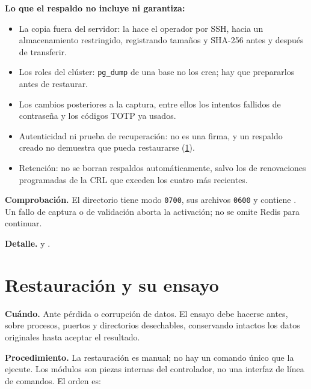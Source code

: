 \textbf{Lo que el respaldo no incluye ni garantiza:}

\begin{itemize}
  \item La copia fuera del servidor: la hace el operador por SSH, hacia un
        almacenamiento restringido, registrando tamaños y SHA-256 antes y
        después de transferir.
  \item Los roles del clúster: \texttt{pg\_dump} de una base no los crea;
        hay que prepararlos antes de restaurar.
  \item Los cambios posteriores a la captura, entre ellos los intentos
        fallidos de contraseña y los códigos TOTP ya usados.
  \item Autenticidad ni prueba de recuperación:  no es una
        firma, y un respaldo creado no demuestra que pueda restaurarse
        (\cref{sec:op-restauracion}).
  \item Retención: no se borran respaldos automáticamente, salvo los de
        renovaciones programadas de la CRL que exceden los cuatro más recientes.
\end{itemize}

\textbf{Comprobación.} El directorio tiene modo \texttt{0700}, sus archivos
\texttt{0600} y contiene . Un fallo de captura o de
validación aborta la activación; no se omite Redis para continuar.


\textbf{Detalle.}  y
.

\section{Restauración y su ensayo}\label{sec:op-restauracion}

\textbf{Cuándo.} Ante pérdida o corrupción de datos. El ensayo debe hacerse
antes, sobre procesos, puertos y directorios desechables, conservando intactos
los datos originales hasta aceptar el resultado.

\textbf{Procedimiento.} La restauración es manual; no hay un comando único
que la ejecute. Los módulos  son piezas
internas del controlador, no una interfaz de línea de comandos. El orden es:

